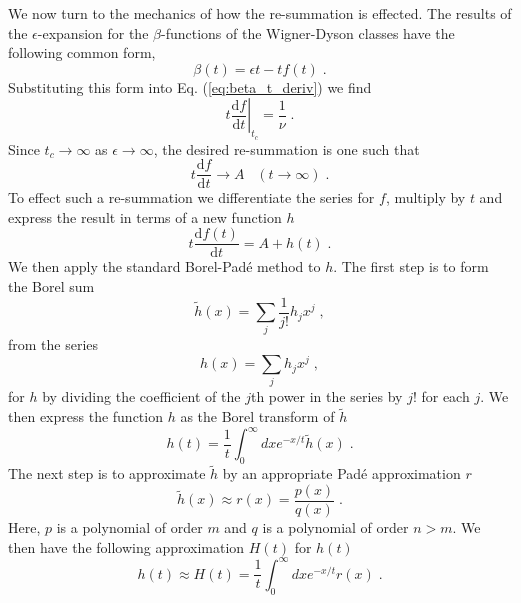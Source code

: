 \documentclass[singlecolumn]{jpsj3}
\begin{document}
We now turn to the mechanics of how the re-summation is effected.
The results of the $\epsilon$-expansion for the $\beta$-functions of the Wigner-Dyson classes have the following common form\cite{Hikami92},
\begin{equation}
	\beta(t) = \epsilon t - t f(t) \;.
\end{equation}
Substituting this form into Eq. (\ref{eq:beta_t_deriv}) we find
\begin{equation}
   \left.t \frac{\mathrm{d} f}{\mathrm{d} t} \right|_{t_c} = \frac{1}{\nu} \;.
\end{equation}
Since $t_c\rightarrow \infty$ as $\epsilon \rightarrow \infty$, the desired re-summation is one such that
\begin{equation}\label{eq:h_limit}
	t \frac{\mathrm{d} f}{\mathrm{d} t} \rightarrow A \;\;\; (t \rightarrow \infty) \;.
\end{equation}
To effect such a re-summation we differentiate the series for $f$, multiply by $t$ and express the result in terms of a new function $h$
\begin{equation}\label{eq:defh}
    t\frac{\mathrm{d} f(t)}{\mathrm{d} t} = A + h(t) \;.
\end{equation}
We then apply the standard Borel-Pad\'e method\cite{Bender99} to $h$.
The first step is to form the Borel sum
\begin{equation}
  \tilde{h}\left( x \right) = \sum_j \frac{1}{j!}h_j x^j \;,
\end{equation}
from the series
\begin{equation}
  h\left( x \right) = \sum_j h_j x^j \;,
\end{equation}
for $h$  by dividing the coefficient of the $j$th power in the series by $j!$ for each $j$.
We then express the function $h$ as the Borel transform of $ \tilde{h}$
\begin{equation}
    h(t) = \frac{1}{t} \int_{0}^{\infty}dx e^{-x/t} \tilde{h} \left( x \right) \;.
\end{equation}
The next step is to approximate $\tilde{h}$ by an appropriate Pad\'e approximation $r$
\begin{equation}
  \tilde{h}\left( x \right) \approx r \left( x \right) = \frac{p \left( x \right)}{q \left( x \right)} \;.
\end{equation}
Here, $p$ is a polynomial of order $m$ and $q$ is a polynomial of order $n>m$. We then have the following approximation $H\left(t\right)$ for $h\left(t\right)$
\begin{equation}\label{eq:h_integral}
    h\left(t\right) \approx H\left(t\right) = \frac{1}{t} \int_{0}^{\infty}dx e^{-x/t} r \left( x \right) \;.
\end{equation}
\end{document}
